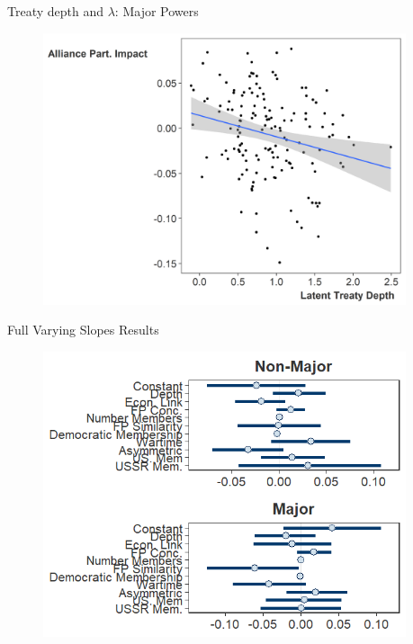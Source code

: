 \documentclass[12pt]{beamer}
\begin{document}

\begin{frame}{Treaty depth and $\lambda$: Major Powers}

\begin{figure}
	\centering
		\includegraphics[width=0.95\textwidth]{ld-lambda-maj.png}
	\label{fig:ls-lambda-min}
\end{figure}


\end{frame}


\begin{frame}{Full Varying Slopes Results}

\begin{figure}[htbp]
	\centering
		\includegraphics[width=0.95\textwidth]{vs-res-full.png}
\end{figure}

\end{frame}
\end{document}
